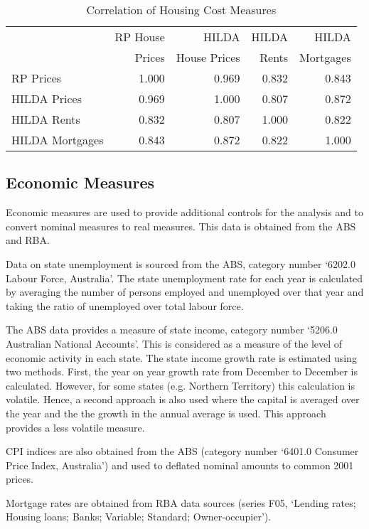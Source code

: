 \documentclass[12pt]{article}
\begin{document}
\begin{table}[htpb] \centering
  \caption{Correlation of Housing Cost Measures}
  \label{houseCor}
\begin{tabular}{@{}lrrrr@{}}
\toprule
 & RP House & HILDA & HILDA & HILDA \tabularnewline
 & Prices & House Prices & Rents & Mortgages \tabularnewline
\midrule
RP Prices & 1.000 & 0.969 & 0.832 & 0.843 \\
  HILDA Prices & 0.969 & 1.000 & 0.807 & 0.872 \\
  HILDA Rents & 0.832 & 0.807 & 1.000 & 0.822 \\
  HILDA Mortgages & 0.843 & 0.872 & 0.822 & 1.000 \\
\bottomrule
\end{tabular}
\end{table}

\subsection{Economic Measures}

Economic measures are used to provide additional controls for the analysis and to convert nominal measures to real measures. This data is obtained from the ABS and RBA.

Data on state unemployment is sourced from the ABS, category number `6202.0 Labour Force, Australia'. The state unemployment rate for each year is calculated by averaging the number of persons employed and unemployed over that year and taking the ratio of unemployed over total labour force.

The ABS data provides a measure of state income, category number `5206.0 Australian National Accounts'. This is considered as a measure of the level of economic activity in each state. The state income growth rate is estimated using two methods. First, the year on year growth rate from December to December is calculated. However, for some states (e.g. Northern Territory) this calculation is volatile. Hence, a second approach is also used where the capital is averaged over the year and the the growth in the annual average is used. This approach provides a less volatile measure.

CPI indices are also obtained from the ABS (category number `6401.0 Consumer Price Index, Australia') and used to deflated nominal amounts to common 2001 prices.

Mortgage rates are obtained from RBA data sources (series F05, `Lending rates; Housing loans; Banks; Variable; Standard; Owner-occupier').
\end{document}
